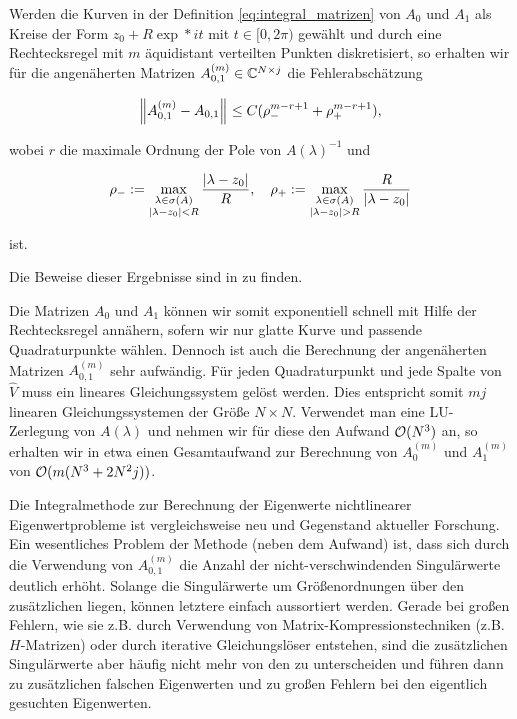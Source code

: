 \begin{theorem}

    Werden die Kurven in der Definition \eqref{eq:integral_matrizen} von $A_0$ und $A_1$ als Kreise der Form $z_0 + R \exp*{i t}$ mit $t \in [0, 2 \pi)$ gewählt und durch eine Rechtecksregel mit $m$ äquidistant verteilten Punkten diskretisiert, so erhalten wir für die angenäherten Matrizen $A_{0, 1}^{(m)} \in \mathbb{C}^{N \times j}$ die Fehlerabschätzung

    \begin{align*}
        {\left \| A_{0, 1}^{(m)} - A_{0, 1} \right \|}_{}
        \leq
        C (\rho_-^{m - r + 1} + \rho_+^{m - r + 1}),
    \end{align*}

    wobei $r$ die maximale Ordnung der Pole von $A(\lambda)^{-1}$ und

    \begin{align*}
        \rho_-
        :=
        \max_{\substack{\lambda \in \sigma(A) \\ {\left | \lambda - z_0 \right |} < R}}
            \frac{{\left | \lambda - z_0 \right |}}{R},
        \quad
        \rho_+
        :=
        \max_{\substack{\lambda \in \sigma(A) \\ {\left | \lambda - z_0 \right |} > R}}
            \frac{R}{{\left | \lambda - z_0 \right |}}
    \end{align*}

    ist.

\end{theorem}

Die Beweise dieser Ergebnisse sind in \cite{BEYN20123839} zu finden.

Die Matrizen $A_0$ und $A_1$ können wir somit exponentiell schnell mit Hilfe der Rechtecksregel annähern, sofern wir nur glatte Kurve und passende Quadraturpunkte wählen.
Dennoch ist auch die Berechnung der angenäherten Matrizen $A_{0, 1}^{(m)}$ sehr aufwändig.
Für jeden Quadraturpunkt und jede Spalte von $\hat V$ muss ein lineares Gleichungssystem gelöst werden.
Dies entspricht somit $m j$ linearen Gleichungssystemen der Größe $N \times N$.
Verwendet man eine LU-Zerlegung von $A(\lambda)$ und nehmen wir für diese den Aufwand $\mathcal{O}(N^3)$ an, so erhalten wir in etwa einen Gesamtaufwand zur Berechnung von $A_0^{(m)}$ und $A_1^{(m)}$ von $\mathcal{O}(m (N^3 + 2 N^2 j))$.

Die Integralmethode zur Berechnung der Eigenwerte nichtlinearer Eigenwertprobleme ist vergleichsweise neu und Gegenstand aktueller Forschung.
Ein wesentliches Problem der Methode (neben dem Aufwand) ist, dass sich durch die Verwendung von $A_{0, 1}^{(m)}$ die Anzahl der nicht-verschwindenden Singulärwerte deutlich erhöht.
Solange die  Singulärwerte um Größenordnungen über den zusätzlichen liegen, können letztere einfach aussortiert werden.
Gerade bei großen Fehlern, wie sie z.B. durch Verwendung von Matrix-Kompressionstechniken (z.B. $H$-Matrizen) oder durch iterative Gleichungslöser entstehen, sind die zusätzlichen Singulärwerte aber häufig nicht mehr von den  zu unterscheiden und führen dann zu zusätzlichen falschen Eigenwerten und zu großen Fehlern bei den eigentlich gesuchten Eigenwerten.

